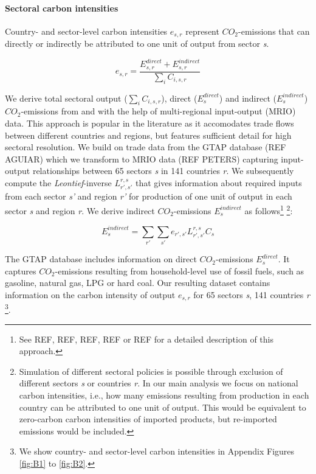 \documentclass[12pt, a4paper]{article}
\begin{document}
\paragraph{Sectoral carbon intensities} Country- and sector-level carbon intensities $e_{s,r}$ represent $CO_{2}$-emissions that can directly or indirectly be attributed to one unit of output from sector \textit{s}.

\begin{equation}
    e_{s,r} = \frac{E_{s,r}^{direct}+E_{s,r}^{indirect}}{\sum_{i} C_{i,s,r}}
\end{equation}

We derive total sectoral output ($\sum_{i} C_{i,s,r}$), direct ($E_{s}^{direct}$) and indirect ($E_{s}^{indirect}$) $CO_{2}$-emissions from and with the help of multi-regional input-output (MRIO) data. This approach is popular in the literature as it accomodates trade flows between different countries and regions, but features sufficient detail for high sectoral resolution. We build on trade data from the GTAP database (REF AGUIAR) which we transform to MRIO data (REF PETERS) capturing input-output relationships between 65 sectors \textit{s} in 141 countries \textit{r}. We subsequently compute the \textit{Leontief}-inverse $L_{r',s'}^{r,s}$ that gives information about required inputs from each sector \textit{s'} and region \textit{r'} for production of one unit of output in each sector \textit{s} and region \textit{r}. We derive indirect $CO_{2}$-emissions $E_{s}^{indirect}$ as follows\footnote{See REF, REF, REF, REF or REF for a detailed description of this approach.} \footnote{Simulation of different sectoral policies is possible through exclusion of different sectors \textit{s} or countries \textit{r}. In our main analysis we focus on national carbon intensities, i.e., how many emissions resulting from production in each country can be attributed to one unit of output. This would be equivalent to zero-carbon carbon intensities of imported products, but re-imported emissions would be included.}:

\begin{equation}
    E_{s}^{indirect} = \sum_{r'} \sum_{s'} e_{r',s'} L_{r',s'}^{r,s} C_{s}
\end{equation}

The GTAP database includes information on direct $CO_{2}$-emissions $E_{s}^{direct}$. It captures $CO_{2}$-emissions resulting from household-level use of fossil fuels, such as gasoline, natural gas, LPG or hard coal.
Our resulting dataset contains information on the carbon intensity of output $e_{s,r}$ for 65 sectors \textit{s}, 141 countries \textit{r} \footnote{We show country- and sector-level carbon intensities in Appendix Figures \ref{fig:B1} to \ref{fig:B2}.}.
\end{document}
